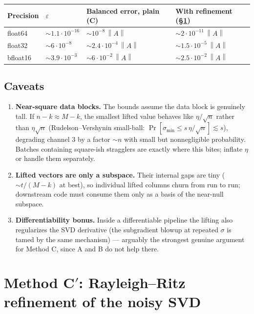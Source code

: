 \documentclass[11pt]{article}
\newcommand{\norm}[1]{\left\lVert #1 \right\rVert}
\begin{document}
\begin{center}
\begin{tabular}{@{}llll@{}}
\toprule
Precision & $\varepsilon$ & Balanced error, plain (C) & With refinement (\S\ref{sec:refine}) \\
\midrule
float64  & $\sim 1.1\cdot10^{-16}$ & $\sim 10^{-8}\,\norm{A}$          & $\sim 2\cdot10^{-11}\,\norm{A}$ \\
float32  & $\sim 6\cdot10^{-8}$    & $\sim 2.4\cdot10^{-4}\,\norm{A}$  & $\sim 1.5\cdot10^{-5}\,\norm{A}$ \\
bfloat16 & $\sim 3.9\cdot10^{-3}$  & $\sim 6\cdot10^{-2}\,\norm{A}$    & $\sim 2.5\cdot10^{-2}\,\norm{A}$ \\
\bottomrule
\end{tabular}
\end{center}

\subsection*{Caveats}

\begin{enumerate}[itemsep=1pt]
  \item \textbf{Near-square data blocks.} The bounds assume the data block is
        genuinely tall. If $n - k \approx M - k$, the smallest lifted value
        behaves like $\eta/\sqrt{n}$ rather than $\eta\sqrt{n}$
        (Rudelson--Vershynin small-ball:
        $\Pr[\sigma_{\min} \le s\,\eta/\sqrt{n}] \lesssim s$), degrading
        channel 3 by a factor $\sim n$ with small but nonnegligible
        probability. Batches containing square-ish stragglers are exactly where
        this bites; inflate $\eta$ or handle them separately.
  \item \textbf{Lifted vectors are only a subspace.} Their internal gaps are
        tiny ($\sim t/(M-k)$ at best), so individual lifted columns churn from
        run to run; downstream code must consume them only as a basis of the
        near-null subspace.
  \item \textbf{Differentiability bonus.} Inside a differentiable pipeline the
        lifting also regularizes the SVD derivative (the subgradient blowup at
        repeated $\sigma$ is tamed by the same mechanism) --- arguably the
        strongest genuine argument for Method C, since A and B do not help
        there.
\end{enumerate}

\section{Method C$'$: Rayleigh--Ritz refinement of the noisy SVD}\label{sec:refine}
\end{document}
